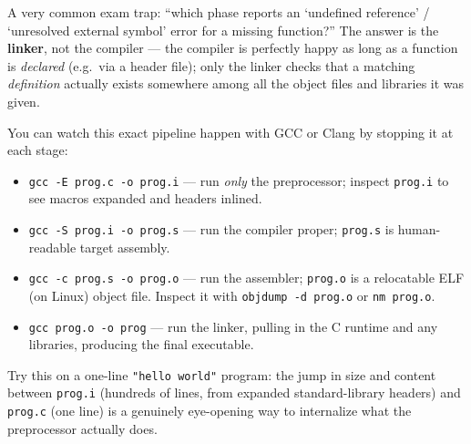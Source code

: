 \documentclass[full-course-notes.tex]{subfiles}
\begin{document}
\begin{examfocus}
A very common exam trap: ``which phase reports an `undefined reference' / `unresolved external
symbol' error for a missing function?'' The answer is the \textbf{linker}, not the compiler ---
the compiler is perfectly happy as long as a function is \emph{declared} (e.g.\ via a header
file); only the linker checks that a matching \emph{definition} actually exists somewhere among
all the object files and libraries it was given.
\end{examfocus}

\begin{enrichment}
You can watch this exact pipeline happen with GCC or Clang by stopping it at each stage:
\begin{itemize}
  \item \texttt{gcc -E prog.c -o prog.i} --- run \emph{only} the preprocessor; inspect
  \texttt{prog.i} to see macros expanded and headers inlined.
  \item \texttt{gcc -S prog.i -o prog.s} --- run the compiler proper; \texttt{prog.s} is
  human-readable target assembly.
  \item \texttt{gcc -c prog.s -o prog.o} --- run the assembler; \texttt{prog.o} is a relocatable
  ELF (on Linux) object file. Inspect it with \texttt{objdump -d prog.o} or \texttt{nm prog.o}.
  \item \texttt{gcc prog.o -o prog} --- run the linker, pulling in the C runtime and any
  libraries, producing the final executable.
\end{itemize}
Try this on a one-line \texttt{"hello world"} program: the jump in size and content between
\texttt{prog.i} (hundreds of lines, from expanded standard-library headers) and \texttt{prog.c}
(one line) is a genuinely eye-opening way to internalize what the preprocessor actually does.
\end{enrichment}
\end{document}
